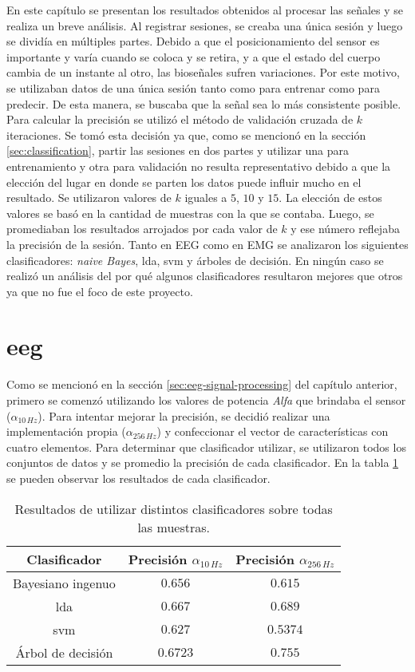 En este capítulo se presentan los resultados obtenidos al procesar las señales y se realiza un breve análisis. Al registrar sesiones,  se creaba una única sesión y luego se dividía en múltiples partes. Debido a que el posicionamiento del sensor es importante y varía cuando se coloca y se retira,  y a que el estado del cuerpo cambia de un instante al otro, las bioseñales sufren variaciones. Por este motivo, se utilizaban datos de una única sesión tanto como para entrenar como para predecir. De esta manera, se buscaba que la señal sea lo más consistente posible. Para calcular la precisión se utilizó el método de validación cruzada de $k$ iteraciones. Se tomó esta decisión ya que, como se mencionó en la sección \ref{sec:classification}, partir las sesiones en dos partes y utilizar una para entrenamiento y otra para validación no resulta representativo debido a que la elección del lugar en donde se parten los datos puede influir mucho en el resultado. Se utilizaron valores de $k$ iguales a $5$, $10$ y $15$. La elección de estos valores se basó en la cantidad de muestras con la que se contaba. Luego, se promediaban los resultados arrojados por cada valor de $k$ y ese número reflejaba la precisión de la sesión. Tanto en EEG como en EMG se analizaron los siguientes clasificadores: \emph{naive Bayes},  \acrshort{lda}, \gls{svm} y árboles de decisión. En ningún caso se realizó un análisis del por qué algunos clasificadores resultaron mejores que otros ya que no fue el foco de este proyecto.

\section{\acrshort{eeg}} \label{sec:eeg-results}

Como se mencionó en la sección \ref{sec:eeg-signal-processing} del capítulo anterior, primero se comenzó utilizando los valores de potencia \emph{Alfa} que brindaba el sensor ($\alpha_{10 \, Hz}$). Para intentar mejorar la precisión, se decidió realizar una implementación propia ($\alpha_{256 \, Hz}$) y confeccionar el vector de características con cuatro elementos. Para determinar que clasificador utilizar, se utilizaron todos los conjuntos de datos y se promedio la precisión de cada clasificador. En la tabla \ref{tab:eeg-class-result} se pueden observar los resultados de cada clasificador.
 
\begin{table}[H]
\centering
\begin{tabular}{ |c|c|c| } 
 \hline
 Clasificador & Precisión $\alpha_{10 \, Hz}$ &  Precisión $\alpha_{256 \, Hz}$ \\ 
 \hline
 Bayesiano ingenuo & $0.656$  & $0.615$  \\
 \hline
 \gls{lda}  & $0.667$ & $0.689$ \\
  \hline
  \gls{svm} & $0.627$ & $0.5374$ \\
  \hline
 Árbol de decisión & $0.6723$ & $0.755$ \\
 \hline
\end{tabular}
\caption{Resultados de utilizar distintos clasificadores sobre todas las muestras.}
\label{tab:eeg-class-result}
\end{table}

